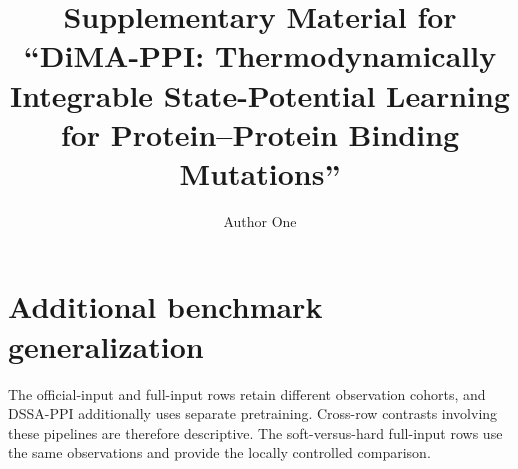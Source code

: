 \documentclass[preprint,12pt]{elsarticle}
\begin{document}
\begin{frontmatter}
\title{Supplementary Material for ``DiMA-PPI: Thermodynamically Integrable State-Potential Learning for Protein--Protein Binding Mutations''}
\author{Author One}
\end{frontmatter}

\section{Additional benchmark generalization}

\begin{table}[H]
\centering
\caption{Additional historical pairwise-antisymmetry benchmarks. Reported baselines use the DSSA-PPI publication. The local official-input variant uses the released 15~\AA{} interface graphs and chain-level ESM-2 features; full-input variants use reconstructed partner structures and residue-level multimodal features. These experiments predate the canonical state-potential formulation. Local values are mean $\pm$ standard deviation over seeds 42--46. Bold marks the better locally controlled full-input formulation, not a statistical comparison with DSSA-PPI.}
\label{tab:additional_benchmarks}
\end{table}

The official-input and full-input rows retain different observation cohorts, and DSSA-PPI additionally uses separate pretraining. Cross-row contrasts involving these pipelines are therefore descriptive. The soft-versus-hard full-input rows use the same observations and provide the locally controlled comparison.
\end{document}
